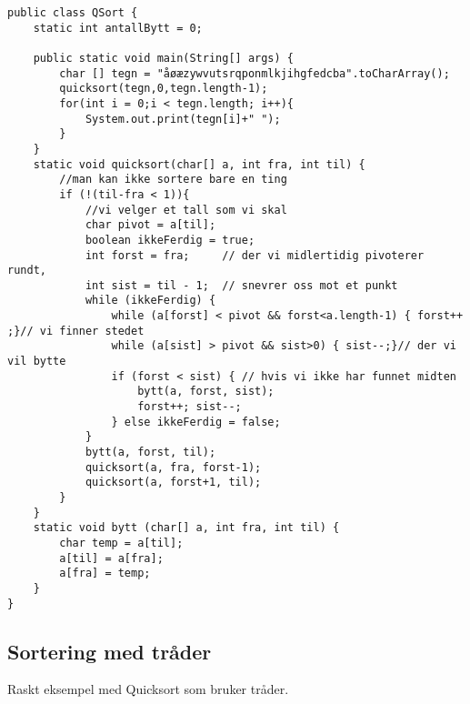 \documentclass[11pt]{article}
\begin{document}
\begin{verbatim}
public class QSort {
    static int antallBytt = 0;

    public static void main(String[] args) {
        char [] tegn = "åøæzywvutsrqponmlkjihgfedcba".toCharArray();
        quicksort(tegn,0,tegn.length-1);
        for(int i = 0;i < tegn.length; i++){
            System.out.print(tegn[i]+" "); 
        }
    }
    static void quicksort(char[] a, int fra, int til) {
        //man kan ikke sortere bare en ting
        if (!(til-fra < 1)){
            //vi velger et tall som vi skal
            char pivot = a[til];
            boolean ikkeFerdig = true;
            int forst = fra;     // der vi midlertidig pivoterer rundt, 
            int sist = til - 1;  // snevrer oss mot et punkt
            while (ikkeFerdig) {
                while (a[forst] < pivot && forst<a.length-1) { forst++ ;}// vi finner stedet
                while (a[sist] > pivot && sist>0) { sist--;}// der vi vil bytte
                if (forst < sist) { // hvis vi ikke har funnet midten
                    bytt(a, forst, sist);
                    forst++; sist--;
                } else ikkeFerdig = false; 
            }
            bytt(a, forst, til);
            quicksort(a, fra, forst-1);
            quicksort(a, forst+1, til);
        }
    }
    static void bytt (char[] a, int fra, int til) {
        char temp = a[til];
        a[til] = a[fra];
        a[fra] = temp;
    }
}
\end{verbatim}
\subsection{Sortering med tråder}
\label{sec-12-3}

Raskt eksempel med Quicksort som bruker tråder.
\end{document}
